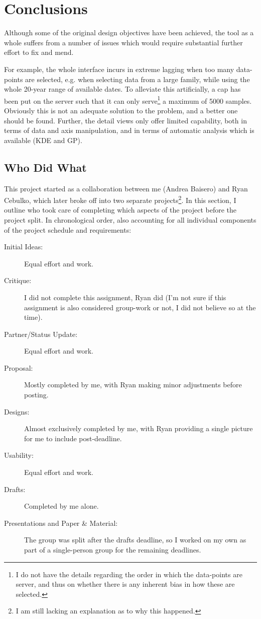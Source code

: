 \documentclass[letterpaper]{article} %
\begin{document}
\section{Conclusions}

Although some of the original design objectives have been achieved, the tool as
a whole suffers from a number of issues which would require substantial further
effort to fix and mend.

For example, the whole interface incurs in extreme lagging when too many
data-points are selected, e.g. when selecting data from a large family, while
using the whole 20-year range of available dates.  To alleviate this
artificially, a cap has been put on the server such that it can only
serve\footnote{I do not have the details regarding the order in which the
data-points are server, and thus on whether there is any inherent bias in how
these are selected.} a maximum of 5000 samples.  Obviously this is not an
adequate solution to the problem, and a better one should be found.  Further,
the detail views only offer limited capability, both in terms of data and axis
manipulation, and in terms of automatic analysis which is available (KDE and
GP).

\subsection*{Who Did What}

This project started as a collaboration between me (Andrea Baisero) and Ryan
Cebulko, which later broke off into two separate projects\footnote{I am still
lacking an explanation as to why this happened.}.  In this section, I outline
who took care of completing which aspects of the project before the project
split.  In chronological order, also accounting for all individual components
of the project schedule and requirements:

\begin{description}
  \item[Initial Ideas:] Equal effort and work.
  \item[Critique:] I did not complete this assignment, Ryan did (I'm not sure
    if this assignment is also considered group-work or not, I did not believe
  so at the time).
  \item[Partner/Status Update:] Equal effort and work.
  \item[Proposal:] Mostly completed by me, with Ryan making minor adjustments
    before posting.
  \item[Designs:] Almost exclusively completed by me, with Ryan providing
    a single picture for me to include post-deadline.
  \item[Usability:] Equal effort and work.
  \item[Drafts:] Completed by me alone.
  \item[Presentations and Paper \& Material:]  The group was split after the
    drafts deadline, so I worked on my own as part of a single-person group for
    the remaining deadlines.
\end{description}
\end{document}
